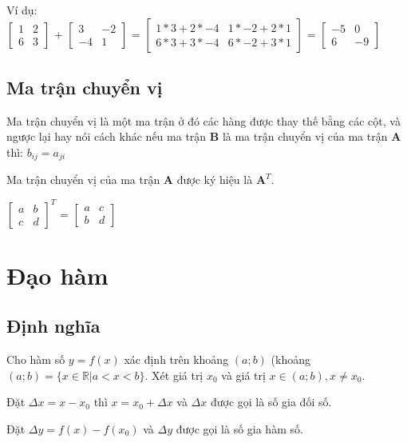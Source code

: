 Ví dụ:\\

$\begin{bmatrix}
   1 & 2 \\6 & 3
\end{bmatrix}$
+ 
$\begin{bmatrix}
3 & -2 \\
-4 & 1
\end{bmatrix}$
=
$\begin{bmatrix}
1 * 3 + 2 * -4 & 1 * -2 + 2 * 1 \\
6 * 3 + 3 * -4  & 6 * -2 + 3 * 1
\end{bmatrix}$
=
$\begin{bmatrix}
-5 & 0\\
6 & -9
\end{bmatrix}$
\subsection{Ma trận chuyển vị}
Ma trận chuyển vị là một ma trận ở đó các hàng được thay thế bằng các cột, và ngược lại hay nói cách khác nếu ma trận \textbf{B} là ma trận chuyển vị của ma trận \textbf{A} thì: $b_{ij} = a_{ji}$ \par
Ma trận chuyển vị của ma trận $\textbf{A}$ được ký hiệu là $\textbf{A}^T$.\\ \par

$\begin{bmatrix}
a & b\\ c&d
\end{bmatrix}^T$
=
$\begin{bmatrix}
a&c\\b&d
\end{bmatrix}$
\section{Đạo hàm}
\subsection{Định nghĩa}
Cho hàm số ${ y=f(x)}$ xác định trên khoảng ${ (a;b)}$ (khoảng ${  (a;b)=\{x\in \mathbb {R} |a<x<b\}}$. Xét giá trị ${  x_{0}}$ và giá trị ${  x\in (a;b),x\neq x_{0}}$. \par 

Đặt $   \Delta x=x-x_0$ thì $  x = x_0+\Delta x$ và $\Delta x$ được gọi là số gia đối số. \par

Đặt $  \Delta y = f(x)-f(x_0)$ và $\Delta y$ được gọi là số gia hàm số. \par


